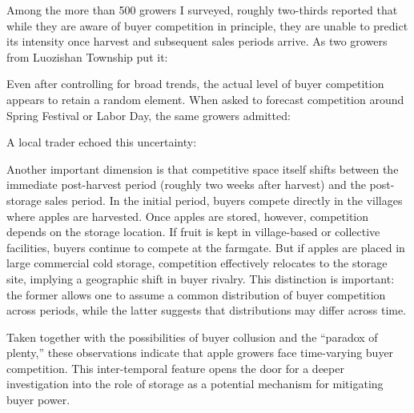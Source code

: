 Among the more than 500 growers I surveyed, roughly two-thirds reported that while they are aware of buyer competition in principle, they are unable to predict its intensity once harvest and subsequent sales periods arrive. As two growers from Luozishan Township put it: 
\begin{quote}  \end{quote}


Even after controlling for broad trends, the actual level of buyer competition appears to retain a random element. When asked to forecast competition around Spring Festival or Labor Day, the same growers admitted: 
\begin{quote}  \end{quote} A local trader echoed this uncertainty: 
\begin{quote}  \end{quote}

Another important dimension is that competitive space itself shifts between the immediate post-harvest period (roughly two weeks after harvest) and the post-storage sales period. In the initial period, buyers compete directly in the villages where apples are harvested. Once apples are stored, however, competition depends on the storage location. If fruit is kept in village-based or collective facilities, buyers continue to compete at the farmgate. But if apples are placed in large commercial cold storage, competition effectively relocates to the storage site, implying a geographic shift in buyer rivalry. This distinction is important: the former allows one to assume a common distribution of buyer competition across periods, while the latter suggests that distributions may differ across time.  

Taken together with the possibilities of buyer collusion and the ``paradox of plenty,'' these observations indicate that apple growers face time-varying buyer competition. This inter-temporal feature opens the door for a deeper investigation into the role of storage as a potential mechanism for mitigating buyer power.






